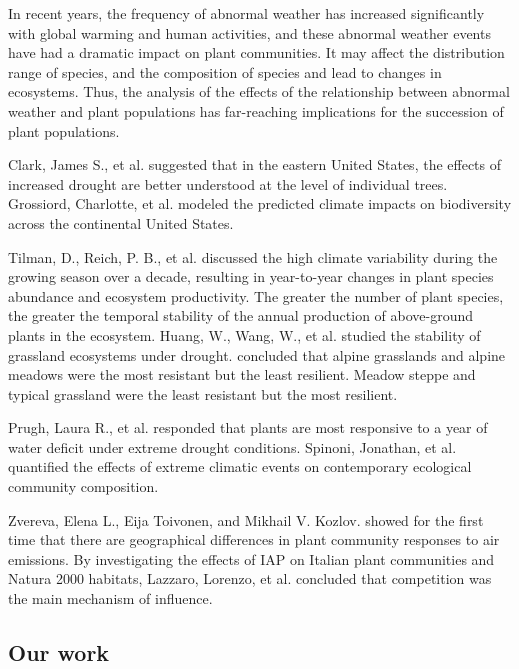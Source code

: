 \documentclass[12pt]{article}
\begin{document}
In recent years, the frequency of abnormal weather has increased significantly with global warming and human activities, and these abnormal weather events have had a dramatic impact on plant communities. It may affect the distribution range of species, and the composition of species and lead to changes in ecosystems. Thus, the analysis of the effects of the relationship between abnormal weather and plant populations has far-reaching implications for the succession of plant populations.

Clark, James S., et al. \cite{clark2016impacts} suggested that in the eastern United States, the effects of increased drought are better understood at the level of individual trees. Grossiord, Charlotte, et al. \cite{grossiord2014does} modeled the predicted climate impacts on biodiversity across the continental United States.

Tilman, D., Reich, P. B., et al. \cite{tilman2006biodiversity} discussed the high climate variability during the growing season over a decade, resulting in year-to-year changes in plant species abundance and ecosystem productivity. The greater the number of plant species, the greater the temporal stability of the annual production of above-ground plants in the ecosystem. Huang, W., Wang, W., et al. \cite{huang2021local}  studied the stability of grassland ecosystems under drought. concluded that alpine grasslands and alpine meadows were the most resistant but the least resilient. Meadow steppe and typical grassland were the least resistant but the most resilient.

Prugh, Laura R., et al. \cite{prugh2018ecological} responded that plants are most responsive to a year of water deficit under extreme drought conditions. Spinoni, Jonathan, et al. \cite{spinoni2014world} quantified the effects of extreme climatic events on contemporary ecological community composition.

Zvereva, Elena L., Eija Toivonen, and Mikhail V. Kozlov. \cite{zvereva2008changes} showed for the first time that there are geographical differences in plant community responses to air emissions. By investigating the effects of IAP on Italian plant communities and Natura 2000 habitats, Lazzaro, Lorenzo, et al. concluded that competition was the main mechanism of influence. \cite{lazzaro2020impact}


\subsection{Our work}
\end{document}
